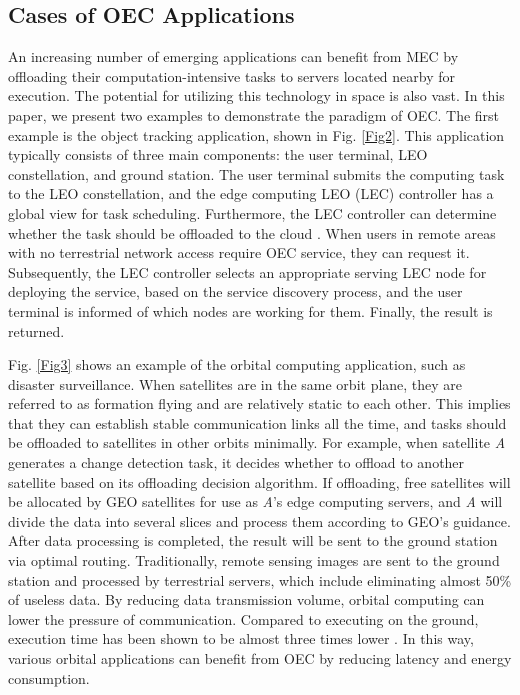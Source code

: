 \documentclass[lettersize,journal]{IEEEtran}
\begin{document}
\subsection{Cases of OEC Applications}
An increasing number of emerging applications can benefit from MEC by offloading their computation-intensive tasks to servers located nearby for execution. The potential for utilizing this technology in space is also vast. In this paper, we present two examples to demonstrate the paradigm of OEC. The first example is the object tracking application, shown in Fig. \ref{Fig2}. This application typically consists of three main components: the user terminal, LEO constellation, and ground station. The user terminal submits the computing task to the LEO constellation, and the edge computing LEO (LEC) controller has a global view for task scheduling. Furthermore, the LEC controller can determine whether the task should be offloaded to the cloud \cite{RN55}. When users in remote areas with no terrestrial network access require OEC service, they can request it. Subsequently, the LEC controller selects an appropriate serving LEC node for deploying the service, based on the service discovery process, and the user terminal is informed of which nodes are working for them. Finally, the result is returned.


Fig. \ref{Fig3} shows an example of the orbital computing application, such as disaster surveillance. When satellites are in the same orbit plane, they are referred to as formation flying  \cite{sabol2001} and are relatively static to each other. This implies that they can establish stable communication links all the time, and tasks should be offloaded to satellites in other orbits minimally. For example, when satellite \emph{A} generates a change detection task, it decides whether to offload to another satellite based on its offloading decision algorithm. If offloading, free satellites will be allocated by GEO satellites for use as \emph{A}'s edge computing servers, and \emph{A} will divide the data into several slices and process them according to GEO's guidance. After data processing is completed, the result will be sent to the ground station via optimal routing. Traditionally, remote sensing images are sent to the ground station and processed by terrestrial servers, which include eliminating almost 50\% of useless data. By reducing data transmission volume, orbital computing can lower the pressure of communication. Compared to executing on the ground, execution time has been shown to be almost three times lower \cite{RN46}. In this way, various orbital applications can benefit from OEC by reducing latency and energy consumption.
\end{document}
